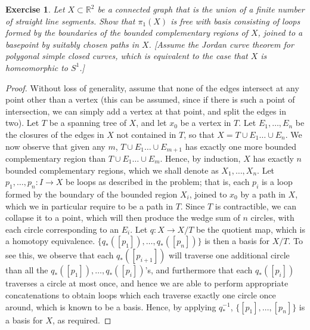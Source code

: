\documentclass{article}
\newtheorem{exercise}{Exercise}[subsection]
\begin{document}
\begin{exercise}
Let $X\subset\mathbb{R}^2$ be a connected graph that is the union of a finite number of straight line segments. Show that $\pi_1(X)$ is free with basis consisting of loops formed by the boundaries of the bounded complementary regions of $X$, joined to a basepoint by suitably chosen paths in $X$. [Assume the Jordan curve theorem for polygonal simple closed curves, which is equivalent to the case that $X$ is homeomorphic to $S^1$.]
\end{exercise}
\begin{proof}
Without loss of generality, assume that none of the edges intersect at any point other than a vertex (this can be assumed, since if there is such a point of intersection, we can simply add a vertex at that point, and split the edges in two). Let $T$ be a spanning tree of $X$, and let $x_0$ be a vertex in $T$. Let $E_1,\dots, E_n$ be the closures of the edges in $X$ not contained in $T$, so that $X=T\cup E_1\dots\cup E_n$. We now observe that given any $m$, $T\cup E_1\dots\cup E_{m+1}$ has exactly one more bounded complementary region than $T\cup E_1\dots\cup E_{m}$. Hence, by induction, $X$ has exactly $n$ bounded complementary regions, which we shall denote as $X_1,\dots, X_n$. Let $p_1,\dots, p_n:I\to X$ be loops as described in the problem; that is, each $p_i$ is a loop formed by the boundary of the bounded region $X_i$, joined to $x_0$ by a path in $X$, which we in particular require to be a path in $T$. Since $T$ is contractible, we can collapse it to a point, which will then produce the wedge sum of $n$ circles, with each circle corresponding to an $E_i$. Let $q:X\to X/T$ be the quotient map, which is a homotopy equivalence. $\{q_*([p_1]),\dots,q_*([p_n])\}$ is then a basis for $X/T$. To see this, we observe that each $q_*([p_{i+1}])$ will traverse one additional circle than all the $q_*([p_1]),\dots,q_*([p_i])$'s, and furthermore that each $q_*([p_i])$ traverses a circle at most once, and hence we are able to perform appropriate concatenations to obtain loops which each traverse exactly one circle once around, which is known to be a basis. Hence, by applying $q_*^{-1}$, $\{[p_1],\dots, [p_n]\}$ is a basis for $X$, as required.
\end{proof}
\end{document}
